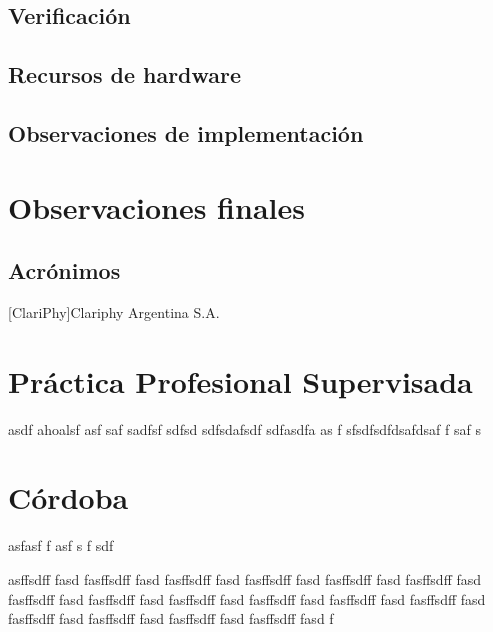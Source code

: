 \documentclass[a4paper]{article}
\begin{document}
\subsection{Verificación}

\subsection{Recursos de hardware}

\subsection{Observaciones de implementación}



\section{Observaciones finales}

\subsection{Acrónimos}
\begin{acronym}
  [ClariPhy]{Clariphy Argentina S.A.}
\end{acronym}


\appendix{}

\section{Práctica Profesional Supervisada}
asdf
ahoalsf asf saf sadfsf sdfsd sdfsdafsdf
sdfasdfa
as
f
sfsdfsdfdsafdsaf f saf s

\section{Córdoba}

asfasf
f
asf
s
f
sdf

asffsdff fasd fasffsdff fasd fasffsdff fasd fasffsdff fasd fasffsdff fasd fasffsdff fasd fasffsdff fasd fasffsdff fasd fasffsdff fasd fasffsdff fasd fasffsdff fasd fasffsdff fasd fasffsdff fasd fasffsdff fasd fasffsdff fasd fasffsdff fasd f
\end{document}
